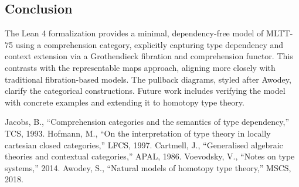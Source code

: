 \documentclass{article}
\begin{document}
\newpage

\subsection{Conclusion}
The Lean 4 formalization provides a minimal, dependency-free model of MLTT-75 using a comprehension category, explicitly capturing type dependency and context extension via a Grothendieck fibration and comprehension functor. This contrasts with the representable maps approach, aligning more closely with traditional fibration-based models. The pullback diagrams, styled after Awodey, clarify the categorical constructions. Future work includes verifying the model with concrete examples and extending it to homotopy type theory.

\begin{thebibliography}{9}
Jacobs, B., ``Comprehension categories and the semantics of type dependency,'' TCS, 1993.
Hofmann, M., ``On the interpretation of type theory in locally cartesian closed categories,'' LFCS, 1997.
Cartmell, J., ``Generalised algebraic theories and contextual categories,'' APAL, 1986.
Voevodsky, V., ``Notes on type systems,'' 2014.
Awodey, S., ``Natural models of homotopy type theory,'' MSCS, 2018.
\end{thebibliography}
\end{document}

